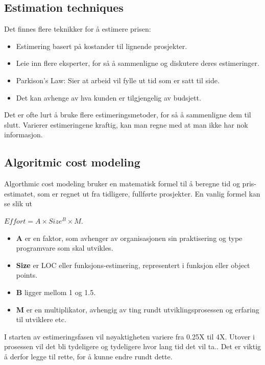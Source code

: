 \documentclass[11pt]{article}
\begin{document}
\subsection{Estimation techniques}
\label{sec-10.2}

   Det finnes flere teknikker for å estimere prisen:

\begin{itemize}
\item Estimering basert på kostander til lignende prosjekter.
\item Leie inn flere eksperter, for så å sammenligne og diskutere deres estimeringer.
\item Parkison's Law: Sier at arbeid vil fylle ut tid som er satt til side.
\item Det kan avhenge av hva kunden er tilgjengelig av budsjett.
\end{itemize}

   Det er ofte lurt å bruke flere estimeringsmetoder, 
   for så å sammenligne dem til slutt. Varierer estimeringene kraftig, 
   kan man regne med at man ikke har nok informasjon.
\subsection{Algoritmic cost modeling}
\label{sec-10.3}

   Algorthmic cost modeling bruker en matematisk formel til å beregne tid og pris-estimatet, 
   som er regnet ut fra tidligere, fullførte prosjekter. En vanlig formel kan se slik ut 
   
   $Effort = A \times Size^B \times M$. 

\begin{itemize}
\item \textbf{A} er en faktor, som avhenger av organisasjonen sin praktisering og type programvare som skal utvikles.
\item \textbf{Size} er LOC eller funksjons-estimering, representert i funksjon eller object points.
\item \textbf{B} ligger mellom 1 og 1.5.
\item \textbf{M} er en multiplikator, avhengig av ting rundt utviklingsprosessen og erfaring til utviklere etc.
\end{itemize}

   I starten av estimeringsfasen vil nøyaktigheten variere fra 0.25X til 4X. Utover i prosessen 
   vil det bli tydeligere og tydeligere hvor lang tid det vil ta.. Det er viktig å derfor legge til rette, for å kunne endre rundt dette.
\end{document}
